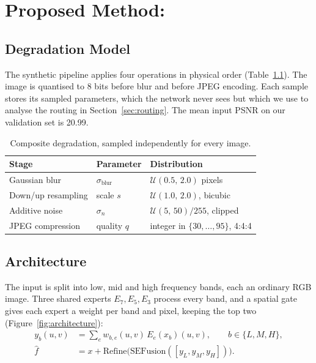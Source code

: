 \chapter{Proposed Method: \fcsg}\label{ch:method}

\section{Degradation Model}\label{sec:degradation}

The synthetic pipeline applies four operations in physical order
(Table~\ref{tab:degradation}). The image is quantised to 8 bits before blur
and before JPEG encoding. Each sample stores its sampled parameters, which the
network never sees but which we use to analyse the routing in
Section~\ref{sec:routing}. The mean input PSNR on our validation set is
20.99\dB{}.

\begin{table}[htbp]
	\centering
	\caption{Composite degradation, sampled independently for every image.}
	\label{tab:degradation}
	\small
	\begin{tabular}{@{}lll@{}}
		\toprule
		Stage & Parameter & Distribution \\
		\midrule
		Gaussian blur        & $\sigma_\text{blur}$ & $\mathcal{U}(0.5,\, 2.0)$ pixels \\
		Down/up resampling   & scale $s$            & $\mathcal{U}(1.0,\, 2.0)$, bicubic \\
		Additive noise       & $\sigma_n$           & $\mathcal{U}(5,\, 50)/255$, clipped \\
		JPEG compression     & quality $q$          & integer in $\{30,\dots,95\}$, 4:4:4 \\
		\bottomrule
	\end{tabular}
\end{table}

\section{Architecture}\label{sec:arch}

The input is split into low, mid and high frequency bands, each an ordinary
RGB image. Three shared experts $E_7,E_5,E_3$ process every band, and a
spatial gate gives each expert a weight per band and pixel, keeping the top
two (Figure~\ref{fig:architecture}):
\begin{align}
	y_b(u,v) &= \textstyle\sum_{e} w_{b,e}(u,v)\, E_e(x_b)(u,v), \qquad b\in\{L,M,H\},\label{eq:mix}\\
	\hat f &= x + \mathrm{Refine}\big(\mathrm{SEFusion}([y_L,y_M,y_H])\big).\label{eq:out}
\end{align}

